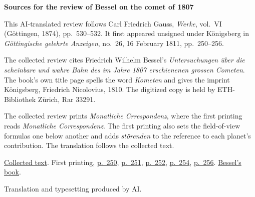 \clearpage\thispagestyle{empty}
\begin{center}\textbf{Sources for the review of Bessel on the comet of 1807}\end{center}
\noindent This AI-translated review follows Carl Friedrich Gauss, \textit{Werke}, vol.~VI (Göttingen, 1874), pp.~530--532. It first appeared unsigned under Königsberg in \textit{Göttingische gelehrte Anzeigen}, no.~26, 16 February 1811, pp.~250--256.
\par\smallskip\noindent The collected review cites Friedrich Wilhelm Bessel’s \textit{Untersuchungen über die scheinbare und wahre Bahn des im Jahre 1807 erschienenen grossen Cometen}. The book’s own title page spells the word \textit{Kometen} and gives the imprint Königsberg, Friedrich Nicolovius, 1810. The digitized copy is held by ETH-Bibliothek Zürich, Rar 33291.
\par\smallskip\noindent The collected review prints \textit{Monatliche Crrespondenz}, where the first printing reads \textit{Monatliche Correspondenz}. The first printing also sets the field-of-view formulas one below another and adds \textit{störenden} to the reference to each planet’s contribution. The translation follows the collected text.
\par\smallskip\noindent \href{https://gdz.sub.uni-goettingen.de/id/PPN236007467}{Collected text}. First printing, \href{https://images.p.sub.uni-goettingen.de/iiif/image/gdz:PPN319721507_1811:00000282/full/1650,/0/default.jpg}{p.~250}, \href{https://images.p.sub.uni-goettingen.de/iiif/image/gdz:PPN319721507_1811:00000283/full/1650,/0/default.jpg}{p.~251}, \href{https://images.p.sub.uni-goettingen.de/iiif/image/gdz:PPN319721507_1811:00000284/full/1650,/0/default.jpg}{p.~252}, \href{https://images.p.sub.uni-goettingen.de/iiif/image/gdz:PPN319721507_1811:00000286/full/1650,/0/default.jpg}{p.~254}, \href{https://images.p.sub.uni-goettingen.de/iiif/image/gdz:PPN319721507_1811:00000288/full/1650,/0/default.jpg}{p.~256}. \href{https://doi.org/10.3931/e-rara-73147}{Bessel’s book}.
\par\smallskip\noindent Translation and typesetting produced by AI.
\clearpage

